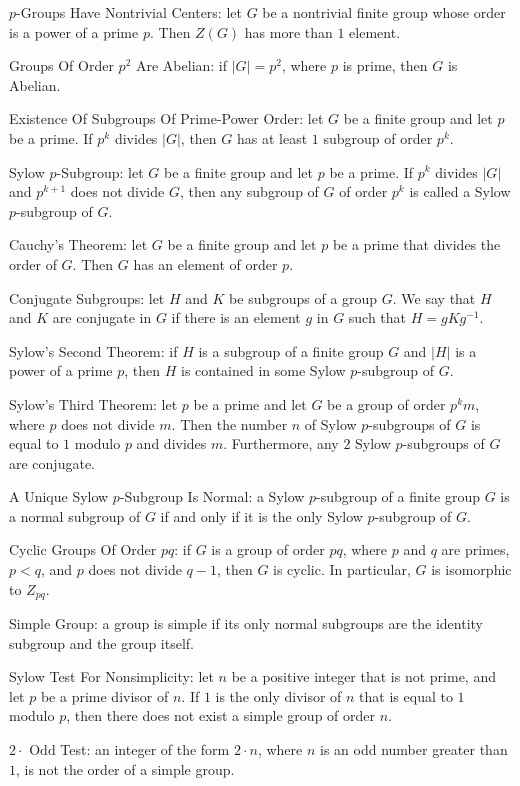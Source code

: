$p$-Groups Have Nontrivial Centers: let $G$ be a nontrivial finite group whose order is a power of a prime $p$. Then $Z(G)$ has more than $1$ element.

Groups Of Order $p^2$ Are Abelian: if $|G|=p^2$, where $p$ is prime, then $G$ is Abelian.

Existence Of Subgroups Of Prime-Power Order: let $G$ be a finite group and let $p$ be a prime. If $p^k$ divides $|G|$, then $G$ has at least $1$ subgroup of order $p^k$.

Sylow $p$-Subgroup: let $G$ be a finite group and let $p$ be a prime. If $p^k$ divides $|G|$ and $p^{k+1}$ does not divide $G$, then any subgroup of $G$ of order $p^k$ is called a Sylow $p$-subgroup of $G$.

Cauchy's Theorem: let $G$ be a finite group and let $p$ be a prime that divides the order of $G$. Then $G$ has an element of order $p$.

Conjugate Subgroups: let $H$ and $K$ be subgroups of a group $G$. We say that $H$ and $K$ are conjugate in $G$ if there is an element $g$ in $G$ such that $H=gKg^{-1}$.

Sylow's Second Theorem: if $H$ is a subgroup of a finite group $G$ and $|H|$ is a power of a prime $p$, then $H$ is contained in some Sylow $p$-subgroup of $G$.

Sylow's Third Theorem: let $p$ be a prime and let $G$ be a group of order $p^k m$, where $p$ does not divide $m$. Then the number $n$ of Sylow $p$-subgroups of $G$ is equal to $1$ modulo $p$ and divides $m$. Furthermore, any $2$ Sylow $p$-subgroups of $G$ are conjugate.

A Unique Sylow $p$-Subgroup Is Normal: a Sylow $p$-subgroup of a finite group $G$ is a normal subgroup of $G$ if and only if it is the only Sylow $p$-subgroup of $G$.

Cyclic Groups Of Order $pq$: if $G$ is a group of order $pq$, where $p$ and $q$ are primes, $p < q$, and $p$ does not divide $q-1$, then $G$ is cyclic. In particular, $G$ is isomorphic to $Z_{pq}$.

Simple Group: a group is simple if its only normal subgroups are the identity subgroup and the group itself.

Sylow Test For Nonsimplicity: let $n$ be a positive integer that is not prime, and let $p$ be a prime divisor of $n$. If $1$ is the only divisor of $n$ that is equal to $1$ modulo $p$, then there does not exist a simple group of order $n$.

$2 \cdot \text{ Odd}$ Test: an integer of the form $2 \cdot n$, where $n$ is an odd number greater than $1$, is not the order of a simple group.

